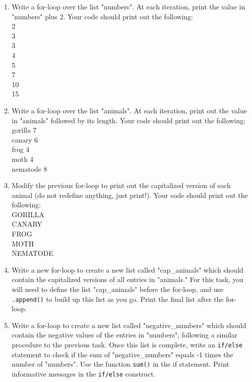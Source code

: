 \documentclass{article}[12pt]
\newcommand{\code}[1]{\texttt{#1}}  %
\begin{document}
\begin{enumerate}

    \item Write a for-loop over the list "numbers". At each iteration, print the value in "numbers" plus 2. Your code should print out the following:\\
        2 \\ 
        3 \\
        3 \\
        4 \\
        5 \\
        7 \\
        10 \\
        15 \\
    \item Write a for-loop over the list "animals". At each iteration, print out the value in "animals" followed by its length. Your code should print out the following:\\
        gorilla 7 \\
        canary 6  \\
        frog 4    \\
        moth 4     \\
        nematode 8  \\
    \item Modify the previous for-loop to print out the capitalized version of each animal (do not redefine anything, just print!). Your code should print out the following:\\
        GORILLA \\
        CANARY  \\
        FROG    \\
        MOTH     \\
        NEMATODE  \\
    \item Write a new for-loop to create a new list called "cap\_animals" which should contain the capitalized versions of all entries in "animals." For this task, you will need to define the list "cap\_animals" before the for-loop, and use \code{.append()} to build up this list as you go. Print the final list after the for-loop.
    
    \item Write a for-loop to create a new list called "negative\_numbers" which should contain the negative values of the entries in "numbers", following a similar procedure to the previous task. Once this list is complete, write an \code{if/else} statement to check if the sum of "negative\_numbers" equals -1 times the number of "numbers". Use the function \code{sum()} in the if statement. Print informative messages in the \code{if/else} construct.
	

\end{enumerate}
\end{document}
